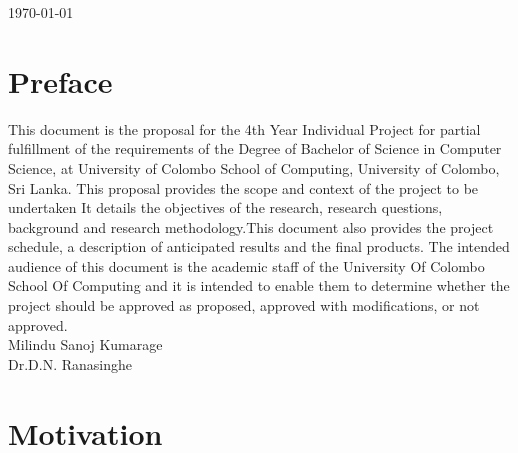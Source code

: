 \documentclass[12pt]{article}
\begin{document}
\begin{titlepage}

{\large \today}\\[3cm] %


 

\vfill %

\end{titlepage}
 

\tableofcontents

\clearpage 
\section{Preface}

This document is the proposal for the 4th Year Individual Project for partial fulfillment of
the requirements of the Degree of Bachelor of Science in Computer Science, at University of
Colombo School of Computing, University of Colombo, Sri Lanka.
This proposal provides the scope and context of the project to be undertaken It details
the objectives of the research, research questions, background and research methodology.This
document also provides the project schedule, a description of anticipated results and the final
products.
The intended audience of this document is the academic staff of the University Of Colombo
School Of Computing and it is intended to enable them to determine whether the project should
be approved as proposed, approved with modifications, or not approved.
\\
[7em]
Milindu Sanoj Kumarage\\
[7em]
Dr.D.N. Ranasinghe\\

\clearpage 

\section{Motivation}
\end{document}

